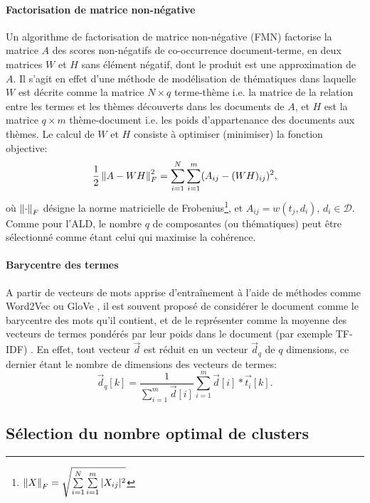 \paragraph[NMF]{Factorisation de matrice non-négative} Un algorithme de factorisation de matrice non-négative (FMN) \citep{paatero1994nmf} factorise la matrice $A$ des scores non-négatifs de co-occurrence document-terme, en deux matrices $W$ et $H$ sans élément négatif, dont le produit est une approximation de $A$. Il s'agit en effet d'une méthode de modélisation de thématiques dans laquelle $W$ est décrite comme la matrice $N\times q$ terme-thème i.e. la matrice de la relation entre les termes et les thèmes découverts dans les documents de $A$, et $H$ est la matrice $q\times m$ thème-document i.e. les poids d'appartenance des documents aux thèmes. Le calcul de $W$ et $H$ consiste à optimiser (minimiser) la fonction objective: \[\frac{1}{2}\left\lVert A - WH\right\rVert^2_F = \sum\limits_{i=1}^N\sum\limits_{i=1}^m (A_{ij} - (WH)_{ij})^2,\] où $\left\lVert\cdot\right\rVert_F$ désigne la norme matricielle de Frobenius\footnote{$\left\lVert X\right\rVert_F = \sqrt{\sum\limits_{i=1}^N\sum\limits_{i=1}^m \vert X_{ij}\vert^2}$}, et $A_{ij} = w(t_j, d_i)$, $d_i \in \mathcal{D}$.  %
Comme pour l'ALD, le nombre $q$ de composantes (ou thématiques) peut être sélectionné comme étant celui qui  maximise la cohérence. 


\paragraph[w2v*TF-IDF]{Barycentre des termes}
A partir de vecteurs de mots apprise d'entraînement à l'aide de méthodes comme Word2Vec \citep{mikolov2013word2vec} ou GloVe \citep{pennington2014glove}, il est souvent proposé de considérer le document comme le barycentre des mots qu'il contient, et de le représenter comme la moyenne des vecteurs de termes pondérés par leur poids dans le document (par exemple TF-IDF) \citep{lemikolov2014word2vec, charlet2017simbow_tal,arora2017wordAvgSentEmbedd}. En effet, tout vecteur $\vec{d}$ est réduit en un vecteur $\vec{d}_q$ de $q$ dimensions, ce dernier étant le nombre de dimensions des vecteurs de termes:\[\vec{d}_q[k] = \frac{1}{\sum\limits_{i=1}^m \vec{d}[i]} \sum\limits_{i=1}^{m}\vec{d}[i]*\vec{t_i}[k].\]

\subsection{Sélection du nombre optimal de clusters}
\label{sec:similarite:k-optimal}

